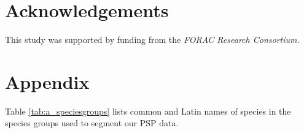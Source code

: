 \documentclass{article}
\begin{document}



\section{Acknowledgements}

This study was supported by funding from the \emph{FORAC Research Consortium}.

\begin{nolinenumbers}


\end{nolinenumbers}

\section*{Appendix}

Table \ref{tab:a_speciesgroups} lists common and Latin names of species in the species groups used to segment our PSP data.
\end{document}
